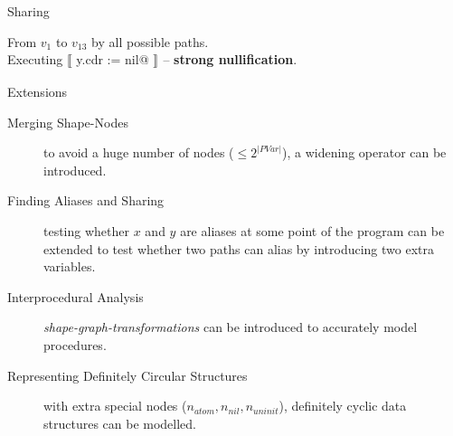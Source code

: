 \documentclass[xcolor={usenames,dvipsnames}]{beamer}
\makeatletter
\newcommand{\transformer}[2]{$\llbracket$ \lstinline@#1@ $\rrbracket_{#2}$}
\makeatother
\begin{document}
\begin{frame}[fragile]{Sharing}
{  From $v_1$ to $v_{13}$ by all possible paths. \\
  Executing \transformer{y.cdr := nil}{} -- \textbf{strong nullification}.

  \begin{center}
  \end{center}
  }
\end{frame}

\begin{frame}[fragile]{Extensions}
  \begin{description}
  \item[Merging Shape-Nodes] to avoid a huge number of nodes ($\leq 2^{|PVar|}$), a widening operator can be introduced.
  \item[Finding Aliases and Sharing] testing whether $x$ and $y$ are aliases at some point of the program can be extended to test whether two paths can alias by introducing two extra variables.
  \item[Interprocedural Analysis] \textit{shape-graph-transformations} can be introduced to accurately model procedures.
  \item[Representing Definitely Circular Structures] with extra special nodes ($n_{atom}, n_{nil}, n_{uninit}$), definitely cyclic data structures can be modelled.
  \end{description}
\end{frame}
\end{document}
